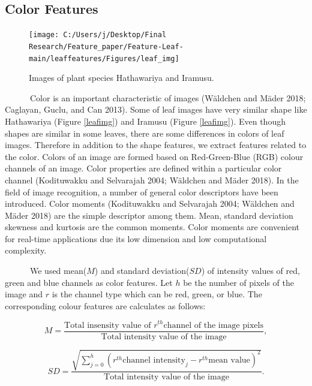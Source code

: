 \documentclass{article}
\begin{document}
\hypertarget{color-features}{%
\subsection{Color Features}\label{color-features}}

\begin{figure}[!ht]

{\centering \texttt{[image: C:/Users/j/Desktop/Final Research/Feature\_paper/Feature-Leaf-main/leaffeatures/Figures/leaf\_img]} 

}

\caption{\label{leafimg} Images of plant species Hathawariya and Iramusu.}\label{fig:unnamed-chunk-27}
\end{figure}

~~~~~~Color is an important characteristic of images (Wäldchen and Mäder
2018; Caglayan, Guclu, and Can 2013). Some of leaf images have very
similar shape like Hathawariya (Figure \ref{leafimg}) and Iramusu
(Figure \ref{leafimg}). Even though shapes are similar in some leaves,
there are some differences in colors of leaf images. Therefore in
addition to the shape features, we extract features related to the
color. Colors of an image are formed based on Red-Green-Blue (RGB)
colour channels of an image. Color properties are defined within a
particular color channel (Kodituwakku and Selvarajah 2004; Wäldchen and
Mäder 2018). In the field of image recognition, a number of general
color descriptors have been introduced. Color moments (Kodituwakku and
Selvarajah 2004; Wäldchen and Mäder 2018) are the simple descriptor
among them. Mean, standard deviation skewness and kurtosis are the
common moments. Color moments are convenient for real-time applications
due its low dimension and low computational complexity.

~~~~~~We used mean(\(M\)) and standard deviation(\(SD\)) of intensity
values of red, green and blue channels as color features. Let \(h\) be
the number of pixels of the image and \(r\) is the channel type which
can be red, green, or blue. The corresponding colour features are
calculates as follows:

\begin{equation}
    M = \frac{\text{Total insensity value of } r^{th} \text{channel of the image pixels}}{\text{Total intensity value of the image}},
\label{equa2}
\end{equation}

\begin{equation}
    SD = \frac{\sqrt{\sum_{j=0}^{h}(r^{th} \text{channel intensity}_j - r^{th} \text{mean value})^2}}{\text{Total intensity value of the image}}.
\label{equa3}
\end{equation}
\end{document}
